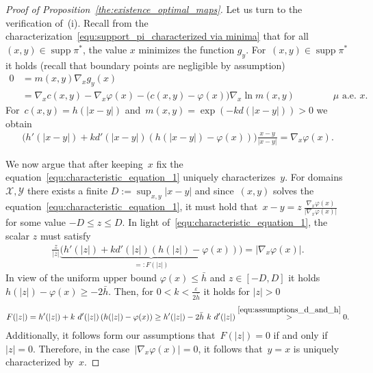\documentclass[10pt,a4paper]{amsart}
\DeclareMathOperator{\supp}{supp}
\begin{document}
\begin{proof}[Proof of Proposition~\ref{the:existence_optimal_maps}]
Let us turn to the verification of~(i).
Recall from the characterization~\eqref{equ:support_pi_characterized via minima} that for all $(x,y) \in \supp \pi^*$, the value $x$ minimizes the function $g_y$. For~$(x,y) \in \supp \pi^*$ it holds (recall that boundary points are negligible by assumption)
\begin{align}\label{equ:characteristic_equation_optimal_map}
    0 &= m(x,y) \nabla_x g_y(x)  \\ & =  \nabla_x c(x,y) - \nabla_x \varphi (x) - \Big(  c(x,y) - \varphi (x)  \Big)  \nabla_x   \ln m(x,y) \qquad \qquad \mbox{$\mu$ a.e.~$x$.} 
\end{align}
For~$c(x,y)= h(|x-y|)$ and~$m(x,y)= \exp (-k d(|x-y|)) >0$ we obtain
\begin{align}\label{equ:characteristic_equation_1}
    \Big(  h'(|x-y|)   + k  d'(|x-y|) \left(h(|x-y|) - \varphi(x) \right) \Big) \frac{x-y}{|x-y|} =  \nabla_x \varphi (x).
\end{align}

We now argue that after keeping~$x$ fix the equation~\eqref{equ:characteristic_equation_1} uniquely characterizes~$y$. 
For domains $\mathcal{X}, \mathcal{Y}$ there exists a finite $D:= \sup_{x,y} |x-y|$ and since~$(x,y)$ solves the equation~\eqref{equ:characteristic_equation_1}, it must hold that~$x-y = z \ \frac{\nabla_x \varphi(x)}{|\nabla_x \varphi(x)|}$ for some value $-D \leq z \leq D$. In light of~\eqref{equ:characteristic_equation_1}, the scalar $z$ must satisfy
\begin{align}\label{eq:T(z)}
    \frac{z}{|z|} \underbrace{\Big(  h'(|z|) +  k  d'(|z|) \left(h(|z|) - \varphi(x) \right)  \Big)}_{=:F(|z|)} = |\nabla_x \varphi(x)|.
\end{align}
In view of the uniform upper bound $\varphi(x) \leq \bar{h}$ and $z \in [-D, D]$ it holds $h(|z|) - \varphi(x)  \geq -2\bar{h}$. Then, for $0 < k < \frac{\varepsilon}{2 \bar{h}}$ it holds for $|z| > 0$
\begin{align*}
    F(|z|) =  h'(|z|) +  k \  d'(|z|) \left(h(|z|) - \varphi(x) \right)  \geq  h'(|z|) - 2 \bar{h} \ k \  d'(|z|) \overset{\eqref{equ:assumptions_d_and_h}}{>} 0.
\end{align*}
Additionally, it follows form our assumptions that~$F(|z|) = 0 $ if and only if~$|z|=0$. Therefore, in the case~$|\nabla_x \varphi(x)| =0$, it follows that~$y=x$ is uniquely characterized by~$x$. \smallskip


\end{proof}
\end{document}
